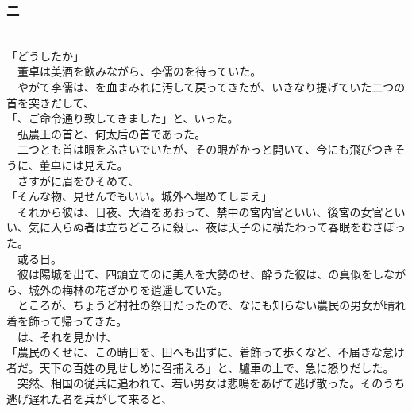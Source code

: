 \documentclass[
  paper=a5,
  fontsize=10pt,
  jafontsize=9.5pt,
  tate,                  %
  open_bracket_pos=nibu, %
]{jlreq}
\begin{document}
\subsubsection{二}

\\


「どうしたか」\\


　董卓は美酒を飲みながら、李儒のを待っていた。\\


　やがて李儒は、を血まみれに汚して戻ってきたが、いきなり提げていた二つの首を突きだして、\\


「、ご命令通り致してきました」と、いった。\\


　弘農王の首と、何太后の首であった。\\


　二つとも首は眼をふさいでいたが、その眼がかっと開いて、今にも飛びつきそうに、董卓には見えた。\\


　さすがに眉をひそめて、\\


「そんな物、見せんでもいい。城外へ埋めてしまえ」\\


　それから彼は、日夜、大酒をあおって、禁中の宮内官といい、後宮の女官といい、気に入らぬ者は立ちどころに殺し、夜は天子のに横たわって春眠をむさぼった。\\


　或る日。\\


　彼は陽城を出て、四頭立てのに美人を大勢のせ、酔うた彼は、の真似をしながら、城外の梅林の花ざかりを逍遥していた。\\


　ところが、ちょうど村社の祭日だったので、なにも知らない農民の男女が晴れ着を飾って帰ってきた。\\


　は、それを見かけ、\\


「農民のくせに、この晴日を、田へも出ずに、着飾って歩くなど、不届きな怠け者だ。天下の百姓の見せしめに召捕えろ」と、驢車の上で、急に怒りだした。\\


　突然、相国の従兵に追われて、若い男女は悲鳴をあげて逃げ散った。そのうち逃げ遅れた者を兵がして来ると、\\
\end{document}
